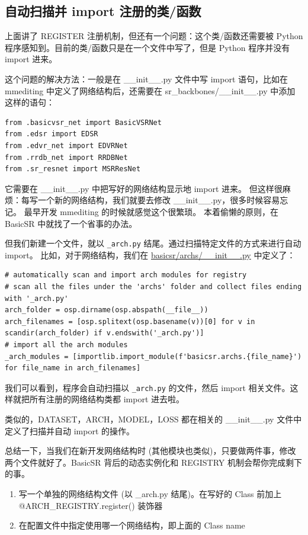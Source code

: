 \documentclass[../main.tex]{subfiles}
\begin{document}
\subsection{自动扫描并 import 注册的类/函数}\label{code_structure:auto_import}

上面讲了 REGISTER 注册机制，但还有一个问题：这个类/函数还需要被 Python 程序感知到。目前的类/函数只是在一个文件中写了，但是 Python 程序并没有 import 进来。

这个问题的解决方法：一般是在 \_\_init\_\_.py 文件中写 import 语句，比如在 mmediting 中定义了网络结构后，还需要在 sr\_backbones/\_\_init\_\_.py 中添加这样的语句：
\begin{verbatim}
from .basicvsr_net import BasicVSRNet
from .edsr import EDSR
from .edvr_net import EDVRNet
from .rrdb_net import RRDBNet
from .sr_resnet import MSRResNet
\end{verbatim}

它需要在 \_\_init\_\_.py 中把写好的网络结构显示地 import 进来。
但这样很麻烦：每写一个新的网络结构，我们就要去修改 \_\_init\_\_.py，很多时候容易忘记。
最早开发 mmediting 的时候就感觉这个很繁琐。
本着偷懒的原则，在 BasicSR 中就找了一个省事的办法。

但我们新建一个文件，就以 \texttt{\_arch.py} 结尾。通过扫描特定文件的方式来进行自动 import。
比如，对于网络结构，我们在 \href{https://github.com/XPixelGroup/BasicSR/blob/master/basicsr/archs/\_\_init\_\_.py}{basicsr/archs/\_\_init\_\_.py} 中定义了：

\begin{verbatim}
# automatically scan and import arch modules for registry
# scan all the files under the 'archs' folder and collect files ending with '_arch.py'
arch_folder = osp.dirname(osp.abspath(__file__))
arch_filenames = [osp.splitext(osp.basename(v))[0] for v in scandir(arch_folder) if v.endswith('_arch.py')]
# import all the arch modules
_arch_modules = [importlib.import_module(f'basicsr.archs.{file_name}') for file_name in arch_filenames]
\end{verbatim}

我们可以看到，程序会自动扫描以 \texttt{\_arch.py} 的文件，然后 import 相关文件。这样就把所有注册的网络结构类都 import 进去啦。

类似的，DATASET，ARCH，MODEL，LOSS 都在相关的 \_\_init\_\_.py 文件中定义了扫描并自动 import 的操作。

总结一下，当我们在新开发网络结构时 (其他模块也类似)，只要做两件事，修改两个文件就好了。BasicSR 背后的动态实例化和 REGISTRY 机制会帮你完成剩下的事。
\begin{enumerate}
    \item 写一个单独的网络结构文件 (以 \_arch.py 结尾)。在写好的 Class 前加上 @ARCH\_REGISTRY.register() 装饰器
    \item 在配置文件中指定使用哪一个网络结构，即上面的 Class name
\end{enumerate}
\end{document}
